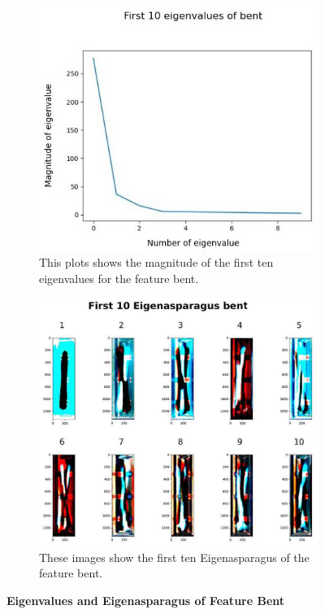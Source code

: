 \begin{figure}[!h]
	\centering
	\begin{subfigure}{0.7\textwidth}
		\includegraphics[width=0.9\linewidth]{Figures/chapter04/pca_bent_graph.png} 
		\caption{This plots shows the magnitude of the first ten eigenvalues for the feature bent.}
	\end{subfigure}
	\vspace{20pt}
	
	\begin{subfigure}{0.9\textwidth}
		\includegraphics[width=0.9\linewidth]{Figures/chapter04/pca_bent.png}
		\caption{These images show the first ten Eigenasparagus of the feature bent.}
	\end{subfigure}
    \caption[First Ten Eigenvalues and Eigenasparagus of Feature Bent]{\textbf{Eigenvalues and Eigenasparagus of Feature Bent}}
    \label{fig:PCAbent}
\end{figure}

